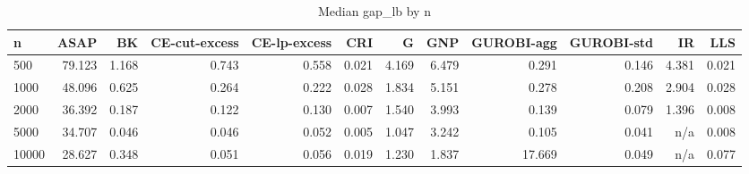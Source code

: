 \begin{table}[htbp]
\centering
\small
\caption{Median gap\_lb by n}
\label{tab:E6_scalability_scaling_gap}
\begin{tabular}{lrrrrrrrrrrr}
\toprule
n & ASAP & BK & CE-cut-excess & CE-lp-excess & CRI & G & GNP & GUROBI-agg & GUROBI-std & IR & LLS \\
\midrule
500 & 79.123 & 1.168 & 0.743 & 0.558 & 0.021 & 4.169 & 6.479 & 0.291 & 0.146 & 4.381 & 0.021 \\
1000 & 48.096 & 0.625 & 0.264 & 0.222 & 0.028 & 1.834 & 5.151 & 0.278 & 0.208 & 2.904 & 0.028 \\
2000 & 36.392 & 0.187 & 0.122 & 0.130 & 0.007 & 1.540 & 3.993 & 0.139 & 0.079 & 1.396 & 0.008 \\
5000 & 34.707 & 0.046 & 0.046 & 0.052 & 0.005 & 1.047 & 3.242 & 0.105 & 0.041 & n/a & 0.008 \\
10000 & 28.627 & 0.348 & 0.051 & 0.056 & 0.019 & 1.230 & 1.837 & 17.669 & 0.049 & n/a & 0.077 \\
\bottomrule
\end{tabular}
\end{table}
